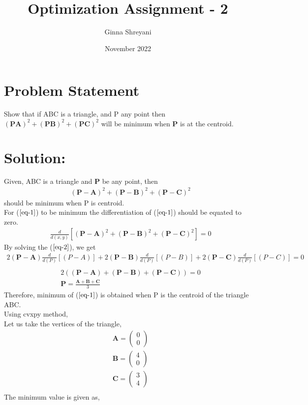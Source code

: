 \documentclass[journal,10pt,twocolumn]{article}
\title{\textbf{Optimization Assignment - 2}}
\author{Ginna Shreyani}
\date{November 2022}
\let\vec\mathbf
\newcommand{\myvec}[1]{\ensuremath{\begin{pmatrix}#1\end{pmatrix}}}
\begin{document}
\maketitle
\section{Problem Statement}
Show that if ABC is a triangle, and P any point then $\vec{(PA)}^2+\vec{(PB)}^2+\vec{(PC)}^2$ will be minimum when $\vec{P}$ is at the centroid.\\
\section{Solution:} 
Given, ABC is a triangle and $\vec{P}$ be any point, then 
\begin{align}
	&\vec{(P-A)}^2+\vec{(P-B)}^2+\vec{(P-C)}^2
\label{eq-1}
\end{align}
should be minimum when P is centroid.\\
For ($\ref{eq-1}$) to be minimum the differentiation of ($\ref{eq-1}$) should be equated to zero.\\
\begin{align}
	&\frac{d}{d(x,y)}[\vec{(P-A)}^2+\vec{(P-B)}^2+\vec{(P-C)}^2]=0
\label{eq-2}
\end{align}
By solving the ($\ref{eq-2}$), we get
\begin{multline}
	2\vec{(P-A)}\frac{d}{d(P)}[(P-A)]+2\vec{(P-B)}\frac{d}{d(P)}[(P-B)]+2\vec{(P-C)}\frac{d}{d(P)}[(P-C)] = 0\\
\end{multline}
\begin{align*}
	&2(\vec{(P-A)}+\vec{(P-B)}+\vec{(P-C)})=0\\
	&\vec{P} = \frac{\vec{A}+\vec{B}+\vec{C}}{3}
\end{align*}
Therefore, minimum of ($\ref{eq-1}$) is obtained when P is the centroid of the triangle ABC.\\
Using cvxpy method,\\
Let us take the vertices of the triangle,\\
\begin{align*}
	&\vec{A}=\myvec{0\\0}\\
	&\vec{B}=\myvec{4\\0}\\
	&\vec{C}=\myvec{3\\4}\\
\end{align*}
The minimum value is given as,\\
\end{document}
